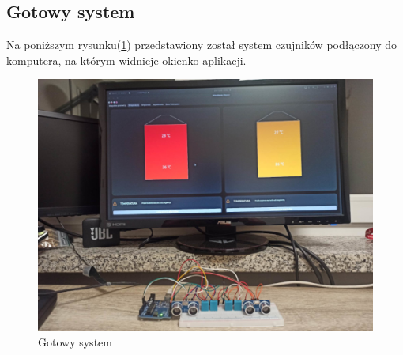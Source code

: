     \subsection{Gotowy system}
        Na poniższym rysunku(\ref{fig: gotowy_system}) przedstawiony został system czujników podłączony do komputera,
        na którym widnieje okienko aplikacji.
        \begin{figure}[H]
            \centering
            \includegraphics[width=\textwidth]{obrazy/czyjniki_monitor.jpg}
            \caption{Gotowy system}
            \label{fig: gotowy_system}
        \end{figure}

